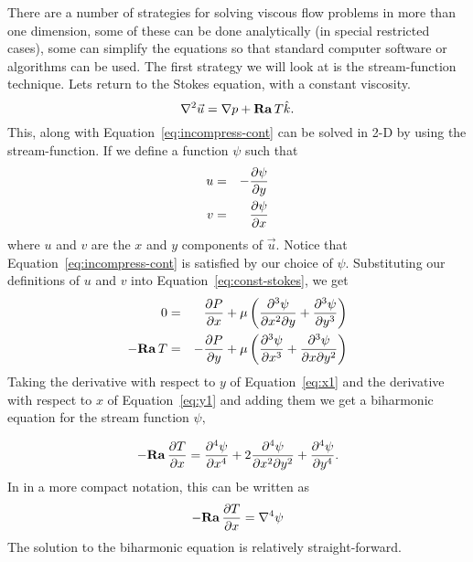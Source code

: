 \documentclass[12pt,twoside]{article}
\begin{document}
There are a number of strategies for solving viscous flow problems in more than
one dimension, some of these can be done analytically (in special restricted
cases), some can simplify the equations so that standard computer software or
algorithms can be used.  The first strategy we will look at is the
stream-function technique. Lets return to the Stokes equation, with a constant
viscosity.
\begin{equation} 
\nabla^2 \vec u = \nabla p +{\bf Ra \,}T\hat k. \label{eq:const-stokes}
\end{equation} 
This, along with Equation~\ref{eq:incompress-cont} can be solved in 2-D
by using the stream-function.  If we define a function $\psi$ such that
\begin{eqnarray} 
u & = &-{{\partial \psi} \over {\partial y}} \\ 
v & = & {{\partial \psi} \over {\partial x}}  
\end{eqnarray} 
where $u$ and $v$ are the $x$ and $y$ components of $\vec u$. 
Notice that Equation~\ref{eq:incompress-cont} is satisfied by our choice of
$\psi $.  Substituting our definitions of $u$ and $v$ into
Equation~\ref{eq:const-stokes}, we get 
\begin{eqnarray}  
0 & = & {{\partial P} \over {\partial x}} + 
\mu \left ({{\partial^3 \psi} \over {\partial x^2 \partial y}} + {{\partial^3
\psi} \over {\partial y^3}} \right ) \label{eq:x1} \\ 
-{\bf Ra \,}T & = & -{{\partial P} \over {\partial y}} + 
\mu \left ({{\partial^3 \psi} \over {\partial x^3 }} +  {{\partial^3\psi} \over
{\partial x \partial y^2}} \right ) \label{eq:y1}
\end{eqnarray} 
Taking the derivative with respect to $y$ of Equation~\ref{eq:x1}
and the derivative with respect to $x$ of Equation~\ref{eq:y1} and adding them
we get a biharmonic equation for the stream function $\psi , $ 

\begin{equation} 
-{\bf Ra \,} {{\partial T}\over{\partial x}} =  
{{\partial^4 \psi} \over {\partial x^4}} + 
2 {{\partial^4 \psi} \over {\partial x^2\partial y^2}} + 
{{\partial^4 \psi} \over {\partial y^4}}. \label{eq:biharmonic}
\end{equation} 
In in a more compact notation, this can be written as
\begin{equation}  
-{\bf Ra \,} {{\partial T}\over{\partial x}} =   \nabla^4 \psi
\end{equation} 
The solution to the biharmonic equation is relatively straight-forward.
 
\end{document}
